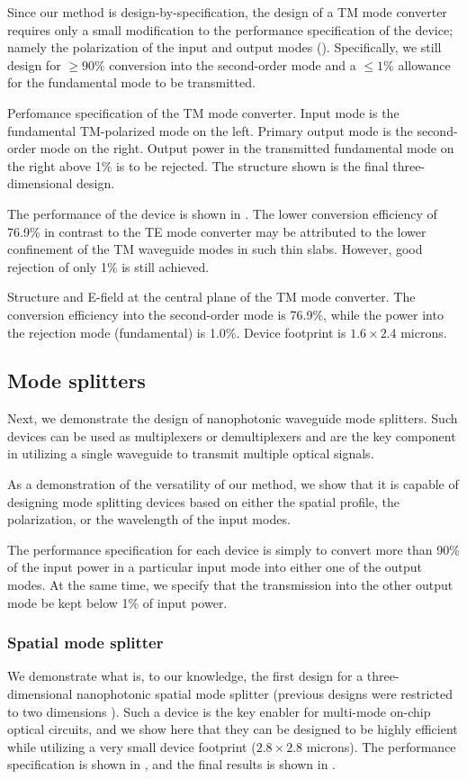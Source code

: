 Since our method is design-by-specification, 
    the design of a TM mode converter requires only
    a small modification to the performance specification of the device;
    namely the polarization of the input and output modes ().
Specifically, we still design for 
    $\ge 90\%$ conversion into the second-order mode and 
    a $\le 1\%$ allowance for the fundamental mode to be transmitted.

    {Perfomance specification of the TM mode converter.
    Input mode is the fundamental TM-polarized mode on the left.
    Primary output mode is the second-order mode on the right.
    Output power in the transmitted fundamental mode on the right 
    above 1\% is to be rejected.
    The structure shown is the final three-dimensional design.}
    
The performance of the device is shown in .
The lower conversion efficiency of 76.9\% in contrast to the TE mode converter
    may be attributed to the lower confinement of the TM waveguide modes 
    in such thin slabs.
However, good rejection of only 1\% is still achieved.

    {Structure and E-field at the central plane of the TM mode converter.
    The conversion efficiency into the second-order mode is 76.9\%,
    while the power into the rejection mode (fundamental) is 1.0\%.
    Device footprint is $1.6\times2.4$ microns.}

\subsection{Mode splitters}
Next, we demonstrate the design of nanophotonic waveguide mode splitters.
Such devices can be used as multiplexers or demultiplexers and
    are the key component in utilizing a single waveguide to transmit 
    multiple optical signals.

As a demonstration of the versatility of our method, 
    we show that it is capable of designing mode splitting devices 
    based on either the spatial profile, the polarization, or the wavelength
    of the input modes.

The performance specification for each device is simply to convert
    more than 90\% of the input power in a particular input mode into
    either one of the output modes.
At the same time, we specify that the transmission into the other output mode 
    be kept below 1\% of input power.

\subsubsection{Spatial mode splitter}
We demonstrate what is, to our knowledge, 
    the first design for a three-dimensional
    nanophotonic spatial mode splitter 
    (previous designs were restricted to two dimensions \cite{2dsplitter}).
Such a device is the key enabler for multi-mode on-chip optical circuits,
    and we show here that they can be designed to be highly efficient
    while utilizing a very small device footprint ($2.8\times2.8$ microns). 
The performance specification is shown in ,
    and the final results is shown in .

